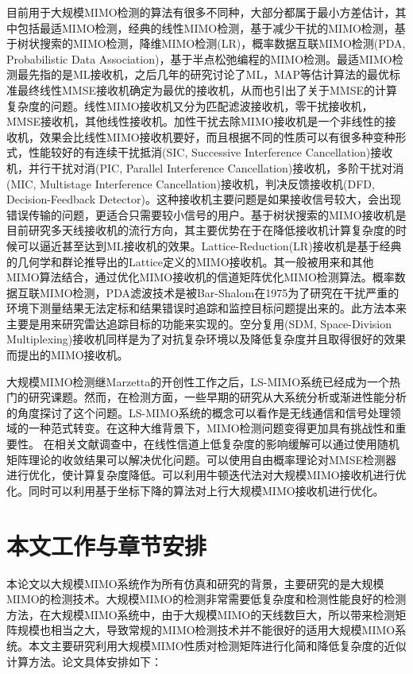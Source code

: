 \documentclass[bachelor,nocolorlinks, printoneside]{seuthesis} %
\begin{document}
\begin{Main}
目前用于大规模MIMO检测的算法有很多不同种，大部分都属于最小方差估计，其中包括最适MIMO检测，经典的线性MIMO检测\cite{muller2001design}，基于减少干扰的MIMO检测，基于树状搜索的MIMO检测，降维MIMO检测(LR)，概率数据互联MIMO检测(PDA, Probabilistic Data Association)，基于半点松弛编程的MIMO检测。最适MIMO检测最先指的是ML接收机，之后几年的研究讨论了ML，MAP等估计算法的最优标准最终线性MMSE接收机确定为最优的接收机，从而也引出了关于MMSE的计算复杂度的问题。线性MIMO接收机又分为匹配滤波接收机，零干扰接收机，MMSE接收机，其他线性接收机。加性干扰去除MIMO接收机是一个非线性的接收机，效果会比线性MIMO接收机要好，而且根据不同的性质可以有很多种变种形式，性能较好的有连续干扰抵消(SIC, Successive Interference Cancellation)接收机\cite{SICD}，并行干扰对消(PIC, Parallel Interference Cancellation)接收机\cite{PIC}，多阶干扰对消(MIC, Multistage Interference Cancellation)接收机\cite{MICD}，判决反馈接收机(DFD, Decision-Feedback Detector)\cite{DFD}\cite{DFD2}。这种接收机主要问题是如果接收信号较大，会出现错误传输的问题，更适合只需要较小信号的用户。基于树状搜索的MIMO接收机是目前研究多天线接收机的流行方向，其主要优势在于在降低接收机计算复杂度的时候可以逼近甚至达到ML接收机的效果。Lattice-Reduction(LR)接收机是基于经典的几何学和群论推导出的Lattice定义的MIMO接收机\cite{LRDetector}。其一般被用来和其他MIMO算法结合，通过优化MIMO接收机的信道矩阵优化MIMO检测算法。概率数据互联MIMO检测，PDA滤波技术是被Bar-Shalom在1975为了研究在干扰严重的环境下测量结果无法定标和结果错误时追踪和监控目标问题提出来的\cite{PDADector}。此方法本来主要是用来研究雷达追踪目标的功能来实现的。空分复用(SDM, Space-Division Multiplexing)接收机同样是为了对抗复杂环境以及降低复杂度并且取得很好的效果而提出的MIMO接收机。

大规模MIMO检测继Marzetta的开创性工作之后，LS-MIMO系统已经成为一个热门的研究课题。然而，在检测方面，一些早期的研究从大系统分析或渐进性能分析的角度探讨了这个问题。LS-MIMO系统的概念可以看作是无线通信和信号处理领域的一种范式转变。在这种大维背景下，MIMO检测问题变得更加具有挑战性和重要性。
在相关文献调查中，在线性信道上低复杂度的影响缓解可以通过使用随机矩阵理论的收敛结果可以解决优化问题。可以使用自由概率理论\cite{hachem2004simple}对MMSE检测器进行优化，使计算复杂度降低。可以利用牛顿迭代法对大规模MIMO接收机进行优化\cite{tang2016high}。同时可以利用基于坐标下降的算法对上行大规模MIMO接收机进行优化。

\section{本文工作与章节安排}
本论文以大规模MIMO系统作为所有仿真和研究的背景，主要研究的是大规模MIMO的检测技术。大规模MIMO的检测非常需要低复杂度和检测性能良好的检测方法，在大规模MIMO系统中，由于大规模MIMO的天线数巨大，所以带来检测矩阵规模也相当之大，导致常规的MIMO检测技术并不能很好的适用大规模MIMO系统。本文主要研究利用大规模MIMO性质对检测矩阵进行化简和降低复杂度的近似计算方法。论文具体安排如下：


\end{Main}
\end{document}
